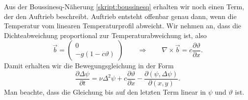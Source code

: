 Aus der Boussinesq-Näherung
\eqref{skript:boussinesq}
erhalten wir noch einen Term, der den
Auftrieb beschreibt.
Auftrieb entsteht offenbar genau dann, wenn die Temperatur vom linearen
Temperaturprofil abweicht.
Wir nehmen an, dass die Dichteabweichung proportional zur Temperaturabweichung
ist, also
\[
\vec{b}
=
\begin{pmatrix}
0\\
-g(1-c\vartheta)
\end{pmatrix}
\qquad
\Rightarrow
\qquad
\nabla\times\vec{b}
=
c\frac{\partial\vartheta}{\partial x}.
\]
Damit erhalten wir die Bewegungsgleichung in der Form
\begin{equation}
\frac{\partial\Delta\psi}{\partial t}
=
\nu\Delta^2\psi 
+c\frac{\partial\vartheta}{\partial x}
-\frac{\partial(\psi,\Delta\psi)}{\partial(x,y)}.
\label{skript:lorenzpsigl}
\end{equation}
Man beachte, dass die Gleichung bis auf den letzten Term linear
in $\psi$ und $\vartheta$ ist.

